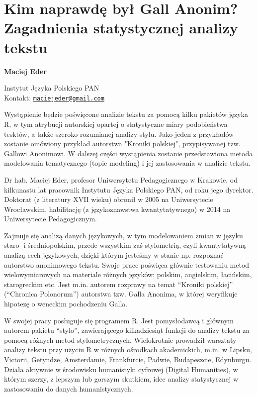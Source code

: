 \documentclass[\main/boa.tex]{subfiles}
\begin{document}
\section{Kim naprawdę był Gall Anonim? \\ Zagadnienia statystycznej analizy tekstu}


\begin{minipage}{0.915\textwidth}
	\centering
  {\bf \huge {} Maciej Eder}
\end{minipage}


\vskip 0.3cm

\begin{affiliations}
\begin{minipage}{0.915\textwidth}
\centering
\large Instytut Języka Polskiego PAN  \\[5pt]
Kontakt: \href{mailto:maciejeder@gmail.com}{\nolinkurl{maciejeder@gmail.com}}\\
\end{minipage}
\end{affiliations}

\vskip 0.8cm

Wystąpienie będzie poświęcone analizie tekstu za pomocą kilku pakietów języka R, w tym atrybucji autorskiej opartej o statystyczne miary podobieństwa tesktów, a także szeroko rozumianej analizy stylu. Jako jeden z przykładów zostanie omówiony przykład autorstwa "Kroniki polskiej", przypisywanej tzw. Gallowi Anonimowi. W dalszej części wystąpienia zostanie przedstawiona metoda modelowania tematycznego (topic modeling) i jej zastosowania w analizie tekstu. 

\bio
Dr hab. Maciej Eder, profesor Uniwersytetu Pedagogicznego w Krakowie, od kilkunastu lat pracownik Instytutu Języka Polskiego PAN, od roku jego dyrektor. Doktorat (z literatury XVII wieku) obronił w 2005 na Uniwersytecie Wrocławskim, habilitację (z językoznawstwa kwantytatywnego) w 2014 na Uniwersytecie Pedagogicznym.

Zajmuje się analizą danych językowych, w tym modelowaniem zmian w języku staro- i średniopolskim, przede wszystkim zaś stylometrią, czyli kwantytatywną analizą cech językowych, dzięki którym jesteśmy w stanie np. rozpoznać autorstwo anonimowego tekstu. Swoje prace poświęca głównie testowaniu metod wielowymiarowych na materiale różnych języków: polskim, angielskim, łacińskim, starogreckim etc. Jest m.in. autorem rozprawy na temat “Kroniki polskiej” (“Chronica Polonorum”) autorstwa tzw. Galla Anonima, w której weryfikuje hipotezę o weneckim pochodzeniu Galla.

W swojej pracy posługuje się programem R. Jest pomysłodawcą i głównym autorem pakietu “stylo”, zawierającego kilkadziesiąt funkcji do analizy tekstu za pomocą różnych metod stylometrycznych. Wielokrotnie prowadził warsztaty analizy tekstu przy użyciu R w różnych ośrodkach akademickich, m.in. w Lipsku, Victorii, Getyndze, Amsterdamie, Frankfurcie, Padwie, Budapeszcie, Edynburgu. Działa aktywnie w środowisku humanistyki cyfrowej (Digital Humanities), w którym szerzy, z lepszym lub gorszym skutkiem, idee analizy statystycznej w zastosowaniu do danych humanistycznych.
\end{document}
